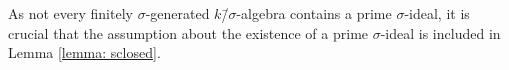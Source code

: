 \documentclass[oneside,reqno]{amsart}
\newtheorem{lemma}[theo]{Lemma}
\theoremstyle{definition}
\newcommand{\p}{\mathfrak{p}}
\newcommand{\s}{\sigma}
\newcommand{\ks}{$k$\=/$\s$}
\begin{document}
%
As not every finitely $\s$-generated \ks-algebra contains a prime $\s$-ideal, it is crucial that the assumption about the existence of a prime $\s$-ideal is included in Lemma \ref{lemma: sclosed}.
% 
%
%
%
%
%
%
%
%
%
%
\end{document}
